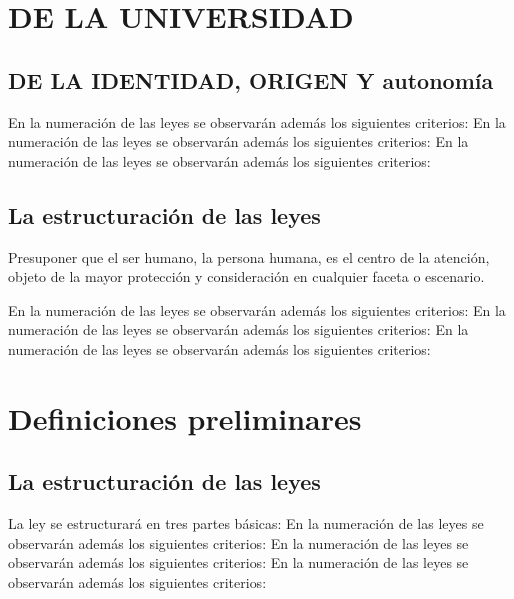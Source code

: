 \documentclass[a4paper,10pt,capitulo,azul,titlepage=false]{upeu-reg}
\begin{document}
\tableofcontents

\newpage


\chapter{DE LA UNIVERSIDAD}
\section{DE LA IDENTIDAD, ORIGEN Y autonomía}
\article 
{}

\paragrafo En la numeración de las leyes se observarán además los siguientes criterios:
\paragrafo En la numeración de las leyes se observarán además los siguientes criterios:
\paragrafo En la numeración de las leyes se observarán además los siguientes criterios:

\section{La estructuración de las leyes}
\article Presuponer  que  el  ser  humano,  la  persona  humana,  es  el  centro  de  la 
atención, objeto de la mayor protección y consideración en cualquier faceta 
o escenario.

\paragrafo En la numeración de las leyes se observarán además los siguientes criterios:
\paragrafo En la numeración de las leyes se observarán además los siguientes criterios:
\paragrafo En la numeración de las leyes se observarán además los siguientes criterios:


\chapter{Definiciones preliminares}
\section{La estructuración de las leyes}
\article La ley se estructurará en tres partes básicas:
\paragrafo En la numeración de las leyes se observarán además los siguientes criterios:
\paragrafo En la numeración de las leyes se observarán además los siguientes criterios:
\paragrafo En la numeración de las leyes se observarán además los siguientes criterios:
\end{document}
